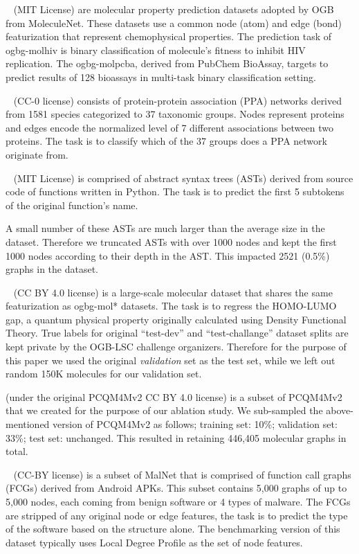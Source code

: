 \documentclass{article}
\begin{document}
~\cite{hu2020ogb} (MIT License) are molecular property prediction datasets adopted by OGB from MoleculeNet. These datasets use a common node (atom) and edge (bond) featurization that represent chemophysical properties. The prediction task of ogbg-molhiv is binary classification of molecule's fitness to inhibit HIV replication. The ogbg-molpcba, derived from PubChem BioAssay, targets to predict results of 128 bioassays in multi-task binary classification setting.

~\cite{hu2020ogb} (CC-0 license) consists of protein-protein association (PPA) networks derived from 1581 species categorized to 37 taxonomic groups. Nodes represent proteins and edges encode the normalized level of 7 different associations between two proteins. The task is to classify which of the 37 groups does a PPA network originate from.

~\cite{hu2020ogb} (MIT License) is comprised of abstract syntax trees (ASTs) derived from source code of functions written in Python. The task is to predict the first 5 subtokens of the original function's name.

A small number of these ASTs are much larger than the average size in the dataset. Therefore we truncated ASTs with over 1000 nodes and kept the first 1000 nodes according to their depth in the AST. This impacted 2521 (0.5\%) graphs in the dataset.

~\cite{hu2021ogblsc} (CC BY 4.0 license) is a large-scale molecular dataset that shares the same featurization as ogbg-mol* datasets. The task is to regress the HOMO-LUMO gap, a quantum physical property originally calculated using Density Functional Theory. True labels for original ``test-dev'' and ``test-challange'' dataset splits are kept private by the OGB-LSC challenge organizers. Therefore for the purpose of this paper we used the original \emph{validation} set as the test set, while we left out random 150K molecules for our validation set.

 (under the original PCQM4Mv2 CC BY 4.0 license) is a subset of PCQM4Mv2~\cite{hu2021ogblsc} that we created for the purpose of our ablation study. We sub-sampled the above-mentioned version of PCQM4Mv2 as follows; training set: 10\%; validation set: 33\%; test set: unchanged. This resulted in retaining 446,405 molecular graphs in total.

~\cite{freitas2021malnet} (CC-BY license) is a subset of MalNet that is comprised of function call graphs (FCGs) derived from Android APKs. This subset contains 5,000 graphs of up to 5,000 nodes, each coming from benign software or 4 types of malware. The FCGs are stripped of any original node or edge features, the task is to predict the type of the software based on the structure alone. The benchmarking version of this dataset typically uses Local Degree Profile as the set of node features.
\end{document}
